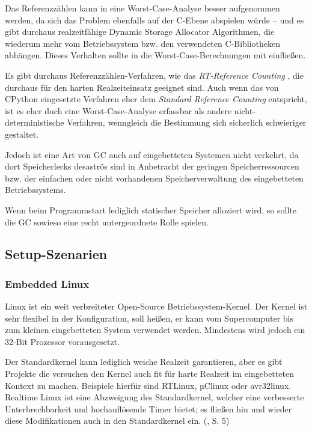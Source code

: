 Das Referenzzählen kann in eine Worst-Case-Analyse besser aufgenommen werden,
da sich das Problem ebenfalls auf der C-Ebene abspielen würde -- und es gibt
durchaus realzeitfähige Dynamic Storage Allocator Algorithmen, die wiederum
mehr vom Betriebssystem bzw. den verwendeten C-Bibliotheken abhängen. Dieses
Verhalten sollte in die Worst-Case-Berechnungen mit einfließen. \cite{malloc}

Es gibt durchaus Referenzzählen-Verfahren, wie das \emph{RT-Reference
Counting} \cite{refcount}, die durchaus für den harten Realzeiteinsatz
geeignet sind.
Auch wenn das von CPython eingesetzte Verfahren eher dem \emph{Standard
Reference Counting} entspricht, ist es eher duch eine Worst-Case-Analyse
erfassbar als andere nicht-deterministische Verfahren,
wenngleich die Bestimmung sich sicherlich schwieriger gestaltet.

Jedoch ist eine Art von GC auch auf eingebetteten Systemen nicht verkehrt, da
dort Speicherlecks desaströs sind in Anbetracht der geringen
Speicherressourcen bzw. der einfachen oder nicht vorhandenen
Speicherverwaltung des eingebetteten Betriebssystems.\cite{refcount}

Wenn beim Programmstart lediglich statischer Speicher alloziert wird, so
sollte die GC sowieso eine recht untergeordnete Rolle spielen.


\subsection{Setup-Szenarien}


\subsubsection{Embedded Linux}


Linux ist ein weit verbreiteter Open-Source Betriebssystem-Kernel. Der Kernel
ist sehr flexibel in der Konfiguration, soll heißen, er kann vom Supercomputer
bis zum kleinen eingebetteten System verwendet werden. Mindestens wird jedoch
ein 32-Bit Prozessor vorausgesetzt.

Der Standardkernel kann lediglich weiche Realzeit garantieren, aber es gibt
Projekte die versuchen den Kernel auch fit für harte Realzeit im eingebetteten
Kontext zu machen. Beispiele hierfür sind RTLinux, µClinux oder avr32linux.
Realtime Linux ist eine Abzweigung des Standardkernel, welcher eine
verbesserte Unterbrechbarkeit und hochauflösende Timer bietet; es fließen hin
und wieder diese Modifikationen auch in den Standardkernel ein. (\cite{dipl}, S. 5)

